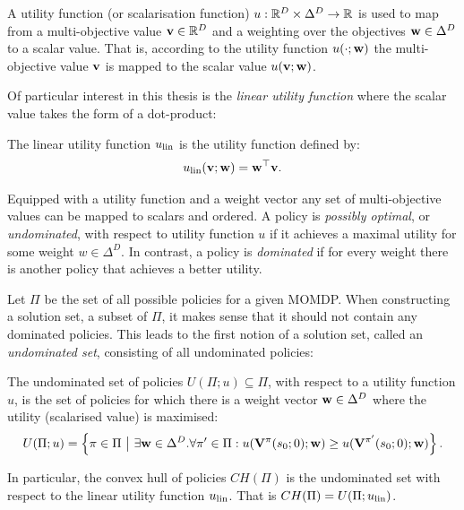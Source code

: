     \begin{defn}
        \label{def:utility_fn}
        \label{def:scalarisation_fn}
        A \textnormal{utility function} (or \textnormal{scalarisation function}) $u:\mathbb{R}^D\times\Delta^D \rightarrow \mathbb{R}$ is used to map from a multi-objective value $\mathbf{v}\in\mathbb{R}^D$ and a weighting over the objectives $\mathbf{w}\in\Delta^D$ to a scalar value. That is, according to the utility function $u(\cdot;\mathbf{w})$ the multi-objective value $\mathbf{v}$ is mapped to the scalar value $u(\mathbf{v};\mathbf{w})$.
    \end{defn}

    Of particular interest in this thesis is the \textit{linear utility function} where the scalar value takes the form of a dot-product:
    \begin{defn}
        \label{def:linear_utility_fn}
        \label{def:linear_scalarisation_fn}
        The \textnormal{linear utility function} $u_{{\textnormal{lin}}}$ is the utility function defined by:
        \begin{align}
            u_{{\textnormal{lin}}}(\mathbf{v};\mathbf{w}) = \mathbf{w}^\top \mathbf{v}. \label{eq:linear_utility_fn_def}
        \end{align}
    \end{defn}

    Equipped with a utility function and a weight vector any set of multi-objective values can be mapped to scalars and ordered. A policy is \textit{possibly optimal}, or \textit{undominated}, with respect to utility function $u$ if it achieves a maximal utility for some weight $w\in\Delta^D$. In contrast, a policy is \textit{dominated} if for every weight there is another policy that achieves a better utility. 
    
    Let $\Pi$ be the set of all possible policies for a given MOMDP. When constructing a solution set, a subset of $\Pi$, it makes sense that it should not contain any dominated policies. This leads to the first notion of a solution set, called an \textit{undominated set}, consisting of all undominated policies:
    \begin{defn}
        \label{def:undominated_set}
        \label{def:convex_hull}
        The \textnormal{undominated set} of policies $U(\Pi;u)\subseteq\Pi$, with respect to a utility function $u$,  is the set of policies for which there is a weight vector $\mathbf{w}\in\Delta^D$ where the utility (scalarised value) is maximised: 
        \begin{align}
            U(\Pi;u) = \left\{\pi\in\Pi\ \big|\ \exists \mathbf{w}\in\Delta^D. \forall \pi'\in\Pi: u(\mathbf{V}^{\pi}(s_0;0);\mathbf{w}) \geq u(\mathbf{V}^{\pi'}(s_0;0);\mathbf{w}) \right\}. \label{eq:undominated_set_def}
        \end{align}

        In particular, the \textnormal{convex hull} of policies $CH(\Pi)$ is the undominated set with respect to the linear utility function $u_{{\textnormal{lin}}}$. That is $CH(\Pi)=U(\Pi;u_{{\textnormal{lin}}})$.
    \end{defn}    
    

